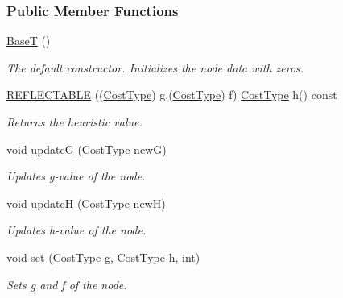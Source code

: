 \subsubsection*{Public Member Functions}
\begin{DoxyCompactItemize}
\item 
\hyperlink{structBaseT_a4cfc45f4f3e3e620af40fa2be5116ea8}{BaseT} ()\hypertarget{structBaseT_a4cfc45f4f3e3e620af40fa2be5116ea8}{}\label{structBaseT_a4cfc45f4f3e3e620af40fa2be5116ea8}

\begin{DoxyCompactList}\small\item\em The default constructor. Initializes the node data with zeros. \end{DoxyCompactList}\item 
\hyperlink{structBaseT_af432df7bf4a7037b2a5f27955d951df8}{R\+E\+F\+L\+E\+C\+T\+A\+B\+LE} ((\hyperlink{structBaseT_a7e56fdca21a53938a87fa1ad516027ea}{Cost\+Type}) g,(\hyperlink{structBaseT_a7e56fdca21a53938a87fa1ad516027ea}{Cost\+Type}) f) \hyperlink{structBaseT_a7e56fdca21a53938a87fa1ad516027ea}{Cost\+Type} h() const 
\begin{DoxyCompactList}\small\item\em Returns the heuristic value. \end{DoxyCompactList}\item 
void \hyperlink{structBaseT_ad019ec4f81937ff66147c5534c9ac968}{updateG} (\hyperlink{structBaseT_a7e56fdca21a53938a87fa1ad516027ea}{Cost\+Type} newG)
\begin{DoxyCompactList}\small\item\em Updates g-\/value of the node. \end{DoxyCompactList}\item 
void \hyperlink{structBaseT_a69d8929f484f0af56883e5239582c41e}{updateH} (\hyperlink{structBaseT_a7e56fdca21a53938a87fa1ad516027ea}{Cost\+Type} newH)
\begin{DoxyCompactList}\small\item\em Updates h-\/value of the node. \end{DoxyCompactList}\item 
void \hyperlink{structBaseT_a20cc44d717e3a93ec165bb03220b75ba}{set} (\hyperlink{structBaseT_a7e56fdca21a53938a87fa1ad516027ea}{Cost\+Type} g, \hyperlink{structBaseT_a7e56fdca21a53938a87fa1ad516027ea}{Cost\+Type} h, int)
\begin{DoxyCompactList}\small\item\em Sets g and f of the node. \end{DoxyCompactList}\end{DoxyCompactItemize}


